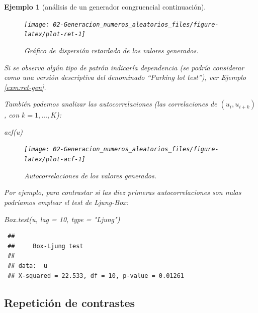 \documentclass[
]{book}
\newenvironment{Shaded}{\begin{snugshade}}{\end{snugshade}}
\newcommand{\AttributeTok}[1]{\textcolor[rgb]{0.77,0.63,0.00}{#1}}
\newcommand{\DecValTok}[1]{\textcolor[rgb]{0.00,0.00,0.81}{#1}}
\newcommand{\FunctionTok}[1]{\textcolor[rgb]{0.00,0.00,0.00}{#1}}
\newcommand{\NormalTok}[1]{#1}
\newcommand{\StringTok}[1]{\textcolor[rgb]{0.31,0.60,0.02}{#1}}
\theoremstyle{break}
\newtheorem{example}{Ejemplo}[chapter]
\theoremstyle{nonumberplain}
\begin{document}
\begin{example}[análisis de un generador congruencial continuación]
\begin{figure}[!htb]

{\centering \texttt{[image: 02-Generacion\_numeros\_aleatorios\_files/figure-latex/plot-ret-1]} 

}

\caption{Gráfico de dispersión retardado de los valores generados.}\label{fig:plot-ret}
\end{figure}

Si se observa algún tipo de patrón indicaría dependencia (se podría considerar como una versión descriptiva del denominado ``Parking lot test''), ver Ejemplo \ref{exm:ret-gen}.

También podemos analizar las autocorrelaciones (las correlaciones de \((u_{i},u_{i+k})\), con \(k=1,\ldots,K\)):

\begin{Shaded}
\begin{Highlighting}[]
\FunctionTok{acf}\NormalTok{(u)}
\end{Highlighting}
\end{Shaded}

\begin{figure}[!htb]

{\centering \texttt{[image: 02-Generacion\_numeros\_aleatorios\_files/figure-latex/plot-acf-1]} 

}

\caption{Autocorrelaciones de los valores generados.}\label{fig:plot-acf}
\end{figure}

Por ejemplo, para contrastar si las diez primeras autocorrelaciones son nulas podríamos emplear el test de Ljung-Box:

\begin{Shaded}
\begin{Highlighting}[]
\FunctionTok{Box.test}\NormalTok{(u, }\AttributeTok{lag =} \DecValTok{10}\NormalTok{, }\AttributeTok{type =} \StringTok{"Ljung"}\NormalTok{)}
\end{Highlighting}
\end{Shaded}

\begin{verbatim}
 ## 
 ##     Box-Ljung test
 ## 
 ## data:  u
 ## X-squared = 22.533, df = 10, p-value = 0.01261
\end{verbatim}

\end{example}

\hypertarget{repeticiuxf3n-de-contrastes}{%
\subsection{Repetición de contrastes}\label{repeticiuxf3n-de-contrastes}}
\end{document}
